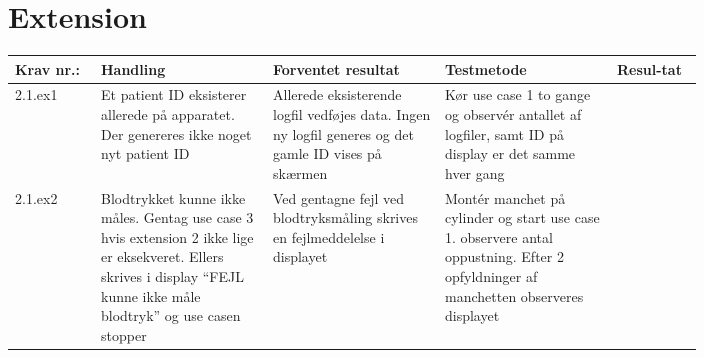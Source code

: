 		\section*{Extension}
			\begin{longtable}{|p{0.1\linewidth}|p{0.2\linewidth}|p{0.2\linewidth}|p{0.2\linewidth}|p{0.1\linewidth}|}
				\hline
				Krav nr.: & Handling & Forventet resultat & Testmetode & Resul-tat  \\\hline
				2.1.ex1 & Et patient ID eksisterer allerede på apparatet. Der genereres ikke noget nyt patient ID & Allerede eksisterende logfil vedføjes data. Ingen ny logfil generes og det gamle ID vises på skærmen & Kør use case 1 to gange og observér antallet af logfiler, samt ID på display er det samme hver gang &  \\
				\hline
				2.1.ex2 & Blodtrykket kunne ikke måles. Gentag use case 3 hvis extension 2 ikke lige er eksekveret. Ellers skrives i display “FEJL kunne ikke måle blodtryk” og use casen stopper  & Ved gentagne fejl ved blodtryksmåling skrives en fejlmeddelelse i displayet & Montér manchet på cylinder og start use case 1. observere antal oppustning. Efter 2 opfyldninger af manchetten observeres displayet & \\ \hline
			\end{longtable}